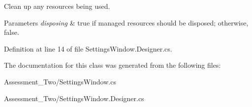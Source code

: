 Clean up any resources being used. 


\begin{DoxyParams}{Parameters}
{\em disposing} & true if managed resources should be disposed; otherwise, false.\\
\hline
\end{DoxyParams}


Definition at line 14 of file SettingsWindow.Designer.cs.



The documentation for this class was generated from the following files:\begin{DoxyCompactItemize}
\item 
Assessment\_\-Two/SettingsWindow.cs\item 
Assessment\_\-Two/SettingsWindow.Designer.cs\end{DoxyCompactItemize}

